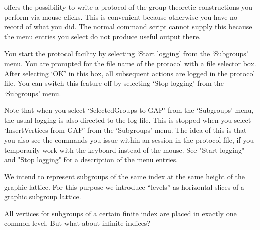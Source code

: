 





\label{loggingfacility}
{\XGAP} offers the possibility to write a protocol of the group
theoretic constructions you perform via mouse clicks. This is
convenient because otherwise you have no record of what you did. The
normal {\GAP} command script cannot supply this because the menu
entries you select do not produce useful output there.

You start the protocol facility by selecting `Start logging' from the
`Subgroups' menu. You are prompted for the file name of the protocol with 
a file selector box. After selecting `OK' in this box, all subsequent
actions are logged in the protocol file. You can switch this feature
off by selecting `Stop logging' from the `Subgroups' menu.

Note that when you select `SelectedGroups to GAP' from the `Subgroups' 
menu, the usual {\GAP} logging is also directed to the {\XGAP} log
  file. This is stopped when you select `InsertVertices from GAP' from 
  the `Subgroups' menu. The idea of this is that you also see the
  {\GAP} commands you issue within an {\XGAP} session in the {\XGAP}
  protocol file, if you temporarily work with the keyboard instead of
  the mouse. See "Start logging" and "Stop logging" for a description
  of the menu entries.



\label{levelsintro}
We intend to represent subgroups of the same index at the same height
of the graphic lattice. For this purpose we introduce ``levels'' as 
horizontal slices of a graphic subgroup lattice. 

All vertices for subgroups of a certain finite index are
placed in exactly one common level. But what about infinite indices?

